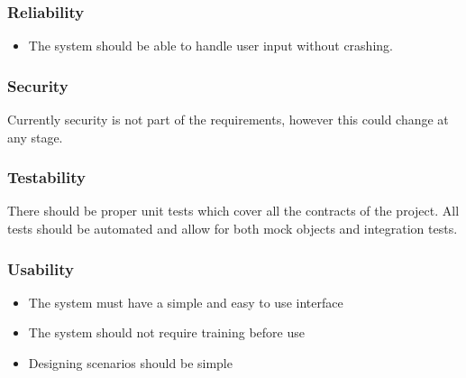 \documentclass[a4paper,12pt]{article}
\begin{document}
\subsubsection{Reliability}
	\begin{itemize}
		\item The system should be able to handle user input without crashing.
	\end{itemize}

\subsubsection{Security}
Currently security is not part of the requirements, however this could change at any stage.



\subsubsection{Testability}
There should be proper unit tests which cover all the contracts of the project. All tests should be automated and allow for both mock objects and integration tests.

\subsubsection{Usability}
	\begin{itemize}
		\item The system must have a simple and easy to use interface
		\item The system should not require training before use
		\item Designing scenarios should be simple
	\end{itemize}



\end{document}
